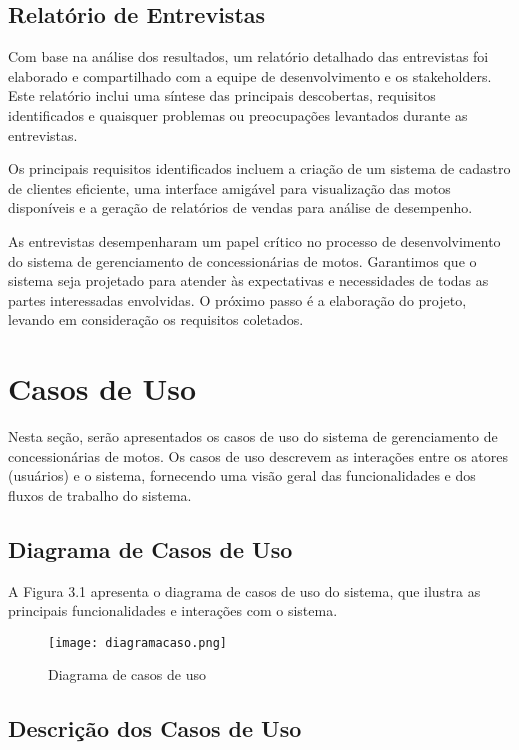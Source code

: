 \subsection{Relatório de Entrevistas}

Com base na análise dos resultados, um relatório detalhado das entrevistas foi elaborado e compartilhado com a equipe de desenvolvimento e os stakeholders. Este relatório inclui uma síntese das principais descobertas, requisitos identificados e quaisquer problemas ou preocupações levantados durante as entrevistas.

Os principais requisitos identificados incluem a criação de um sistema de cadastro de clientes eficiente, uma interface amigável para visualização das motos disponíveis e a geração de relatórios de vendas para análise de desempenho.

As entrevistas desempenharam um papel crítico no processo de desenvolvimento do sistema de gerenciamento de concessionárias de motos. Garantimos que o sistema seja projetado para atender às expectativas e necessidades de todas as partes interessadas envolvidas. O próximo passo é a elaboração do projeto, levando em consideração os requisitos coletados.



\section{Casos de Uso}

Nesta seção, serão apresentados os casos de uso do sistema de gerenciamento de concessionárias de motos. Os casos de uso descrevem as interações entre os atores (usuários) e o sistema, fornecendo uma visão geral das funcionalidades e dos fluxos de trabalho do sistema.

\subsection{Diagrama de Casos de Uso}

A Figura 3.1 apresenta o diagrama de casos de uso do sistema, que ilustra as principais funcionalidades e interações com o sistema.

\begin{figure}[h]
	\centering
	\texttt{[image: diagramacaso.png]}
	\caption{Diagrama de casos de uso}
	\label{fig:Diagrama de casos de uso}
\end{figure}

\subsection{Descrição dos Casos de Uso}

